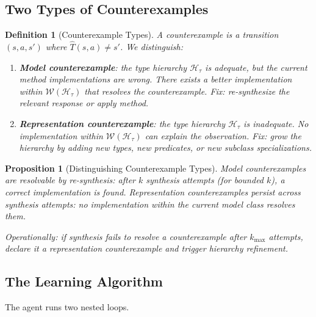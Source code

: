 \documentclass{article}
\newtheorem{definition}{Definition}
\newtheorem{proposition}{Proposition}
\newcommand{\calH}{\mathcal{H}}
\newcommand{\calW}{\mathcal{W}}
\begin{document}
\subsection{Two Types of Counterexamples}
\label{sec:counterexamples}

\begin{definition}[Counterexample Types]
\label{def:cx_types}
A counterexample is a transition $(s, a, s')$ where $\hat{T}(s, a) \neq s'$.
We distinguish:

\begin{enumerate}[nosep]
    \item \textbf{Model counterexample}: the type hierarchy $\calH_\tau$ is
          adequate, but the current method implementations are wrong.  There
          exists a better implementation within $\calW(\calH_\tau)$ that
          resolves the counterexample.  Fix: re-synthesize the relevant
          response or apply method.

    \item \textbf{Representation counterexample}: the type hierarchy
          $\calH_\tau$ is inadequate.  No implementation within
          $\calW(\calH_\tau)$ can explain the observation.  Fix: grow the
          hierarchy by adding new types, new predicates, or new subclass
          specializations.
\end{enumerate}
\end{definition}

\begin{proposition}[Distinguishing Counterexample Types]
\label{prop:distinguish}
Model counterexamples are resolvable by re-synthesis: after $k$ synthesis
attempts (for bounded $k$), a correct implementation is found.
Representation counterexamples persist across synthesis attempts: no
implementation within the current model class resolves them.

Operationally: if synthesis fails to resolve a counterexample after $k_{\max}$
attempts, declare it a representation counterexample and trigger hierarchy
refinement.
\end{proposition}

\subsection{The Learning Algorithm}
\label{sec:algorithm}

The agent runs two nested loops.
\end{document}
